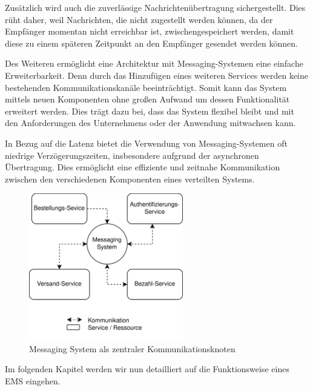 Zusätzlich wird auch die zuverlässige Nachrichtenübertragung sichergestellt. Dies rüht daher, weil Nachrichten, die nicht zugestellt werden können, da der Empfänger momentan nicht erreichbar ist, zwischengespeichert werden, damit diese zu einem späteren Zeitpunkt an den Empfänger gesendet werden können. \cite{curryMessageOrientedMiddleware2004}

Des Weiteren ermöglicht eine Architektur mit Messaging-Systemen eine einfache Erweiterbarkeit. Denn durch das Hinzufügen eines weiteren Services werden keine bestehenden Kommunikationskanäle beeinträchtigt. Somit kann das System mittels neuen Komponenten ohne großen Aufwand um dessen Funktionalität erweitert werden. Dies trägt dazu bei, dass das System flexibel bleibt und mit den Anforderungen des Unternehmens oder der Anwendung mitwachsen kann. \cite{curryMessageOrientedMiddleware2004}

In Bezug auf die Latenz bietet die Verwendung von Messaging-Systemen oft niedrige Verzögerungszeiten, insbesondere aufgrund der asynchronen Übertragung. Dies ermöglicht eine effiziente und zeitnahe Kommunikation zwischen den verschiedenen Komponenten eines verteilten Systems. \cite{curryMessageOrientedMiddleware2004}

\begin{figure}
    \centering
    \includegraphics[width=0.6\textwidth]{content/img/Research/Message_Services/kommunikationWithMessagingSystemRabbitMQ.png}
    \caption{Messaging System als zentraler Kommunikationsknoten}
    \label{fig:messagingSystemsKommunikation}
\end{figure}
\FloatBarrier

Im folgenden Kapitel werden wir nun detailliert auf die Funktionsweise eines EMS eingehen.
